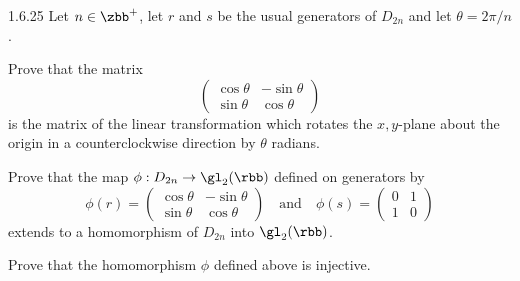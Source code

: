 \begin{exercise}{1.6.25}
    Let $n \in \zbb^+$, let $r$ and $s$ be the usual generators of $D_{2n}$ and let $\theta = 2\pi / n$.
    \begin{subexercises}
        \item Prove that the matrix 
        \[
            \begin{pmatrix}
                \cos \theta & -\sin \theta \\
                \sin \theta & \cos \theta
            \end{pmatrix}
        \]
        is the matrix of the linear transformation which rotates the $x,y$-plane about the origin in a counterclockwise direction by $\theta$ radians.
        \item Prove that the map $\phi : D_{2n} \to \gl_2(\rbb)$ defined on generators by
        \[
            \phi(r) = 
            \begin{pmatrix}
                \cos \theta & -\sin \theta \\
                \sin \theta & \cos \theta
            \end{pmatrix}
            \quad \text{and} \quad
            \phi(s) = 
            \begin{pmatrix}
                0 & 1 \\
                1 & 0
            \end{pmatrix}
        \]
        extends to a homomorphism of $D_{2n}$ into $\gl_2(\rbb)$.
        \item Prove that the homomorphism $\phi$ defined above is injective.
    \end{subexercises}
\end{exercise}

